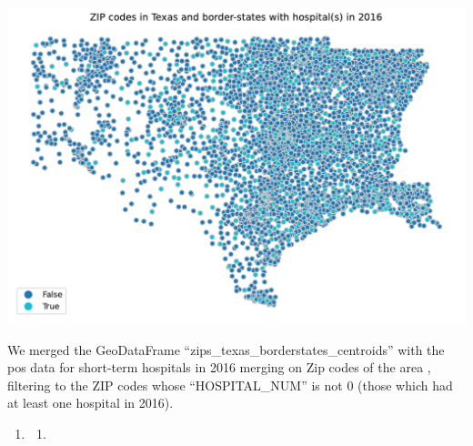 \documentclass[
  letterpaper,
  DIV=11,
  numbers=noendperiod]{scrartcl}
\providecommand{\tightlist}{%
  \setlength{\itemsep}{0pt}\setlength{\parskip}{0pt}}\usepackage{longtable,booktabs,array}
\begin{document}
\includegraphics{pset4_files/figure-pdf/cell-30-output-2.pdf}

We merged the GeoDataFrame ``zips\_texas\_borderstates\_centroids'' with
the pos data for short-term hospitals in 2016 merging on Zip codes of
the area , filtering to the ZIP codes whose ``HOSPITAL\_NUM'' is not 0
(those which had at least one hospital in 2016).

\begin{enumerate}
\def\labelenumi{\arabic{enumi}.}
\setcounter{enumi}{3}
\tightlist
\item
  \begin{enumerate}
  \def\labelenumii{\alph{enumii}.}
  \tightlist
  \item
  \end{enumerate}
\end{enumerate}
\end{document}
